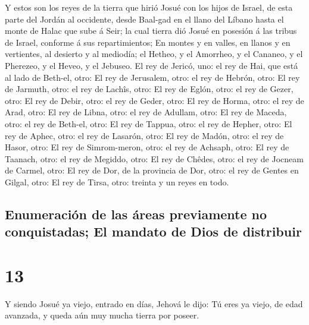  Y estos son los reyes de la tierra que hirió Josué con
los hijos de Israel, de esta parte del Jordán al occidente, desde
Baal-gad en el llano del Líbano hasta el monte de Halac que sube á Seir;
la cual tierra dió Josué en posesión á las tribus de Israel, conforme á
sus repartimientos;  En montes y en valles, en llanos y en
vertientes, al desierto y al mediodía; el Hetheo, y el Amorrheo, y el
Cananeo, y el Pherezeo, y el Heveo, y el Jebuseo.  El rey
de Jericó, uno: el rey de Hai, que está al lado de Beth-el, otro:
 El rey de Jerusalem, otro: el rey de Hebrón, otro:
 El rey de Jarmuth, otro: el rey de Lachîs, otro:
 El rey de Eglón, otro: el rey de Gezer, otro:
 El rey de Debir, otro: el rey de Geder, otro:
 El rey de Horma, otro: el rey de Arad, otro:
 El rey de Libna, otro: el rey de Adullam, otro:
 El rey de Maceda, otro: el rey de Beth-el, otro:
 El rey de Tappua, otro: el rey de Hepher, otro:
 El rey de Aphec, otro: el rey de Lasarón, otro:
 El rey de Madón, otro: el rey de Hasor, otro:
 El rey de Simrom-meron, otro: el rey de Achsaph, otro:
 El rey de Taanach, otro: el rey de Megiddo, otro:
 El rey de Chêdes, otro: el rey de Jocneam de Carmel,
otro:  El rey de Dor, de la provincia de Dor, otro: el
rey de Gentes en Gilgal, otro:  El rey de Tirsa, otro:
treinta y un reyes en todo.

\hypertarget{enumeraciuxf3n-de-las-uxe1reas-previamente-no-conquistadas-el-mandato-de-dios-de-distribuir}{%
\subsection{Enumeración de las áreas previamente no conquistadas; El
mandato de Dios de
distribuir}\label{enumeraciuxf3n-de-las-uxe1reas-previamente-no-conquistadas-el-mandato-de-dios-de-distribuir}}

\hypertarget{section-06-13}{%
\section{13}\label{section-06-13}}

 Y siendo Josué ya viejo, entrado en días, Jehová le dijo:
Tú eres ya viejo, de edad avanzada, y queda aún muy mucha tierra por
poseer.

